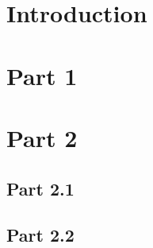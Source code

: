 \documentclass[french]{insa} %
\begin{document}
\maketitle      %
\makecoverpage  %


\tableofcontents

\clearpage

\section{Introduction}
\lipsum*[1]

\clearpage

\section{Part 1}
\lipsum

\clearpage

\section{Part 2}
\lipsum*[1]
\subsection{Part 2.1}
\lipsum
\subsection{Part 2.2}
\lipsum

\clearpage



\makefourthcover    %
\end{document}
